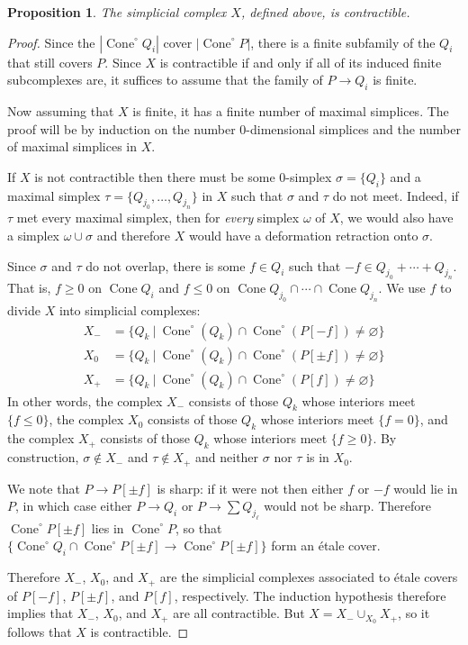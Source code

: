 \documentclass[12pt]{amsart}
\newtheorem{proposition}[theorem]{Proposition}
\theoremstyle{definition}
\theoremstyle{remark}
\def\Cone{\operatorname{Cone}}
\begin{document}
\begin{proposition}
The simplicial complex $X$, defined above, is contractible.
\end{proposition}
\begin{proof}
Since the $|\Cone^\circ Q_i|$ cover $|\Cone^\circ P|$, there is a finite subfamily of the $Q_i$ that still covers $P$.  Since $X$ is contractible if and only if all of its induced finite subcomplexes are, it suffices to assume that the family of $P \to Q_i$ is finite.

Now assuming that $X$ is finite, it has a finite number of maximal simplices.  The proof will be by induction on the number $0$-dimensional simplices and the number of maximal simplices in $X$.

If $X$ is not contractible then there must be some $0$-simplex $\sigma = \{ Q_i \}$ and a maximal simplex $\tau = \{ Q_{j_0}, \ldots, Q_{j_n} \}$ in $X$ such that $\sigma$ and $\tau$ do not meet.  Indeed, if $\tau$ met every maximal simplex, then for \emph{every} simplex $\omega$ of $X$, we would also have a simplex $\omega \cup \sigma$ and therefore $X$ would have a deformation retraction onto $\sigma$.

Since $\sigma$ and $\tau$ do not overlap, there is some $f \in Q_i$ such that $-f \in Q_{j_0} + \cdots + Q_{j_n}$.  That is, $f \geq 0$ on $\Cone Q_i$ and $f \leq 0$ on $\Cone Q_{j_0} \cap \cdots \cap \Cone Q_{j_n}$.  We use $f$ to divide $X$ into simplicial complexes:
\begin{align*}
X_- & = \{ Q_k \: \big| \: \Cone^\circ(Q_k) \cap \Cone^\circ(P[-f]) \neq \varnothing \} \\
X_0 & = \{ Q_k \: \big| \: \Cone^\circ(Q_k) \cap \Cone^\circ(P[\pm f]) \neq \varnothing \} \\
X_+ & = \{ Q_k \: \big| \: \Cone^\circ(Q_k) \cap \Cone^\circ(P[f]) \neq \varnothing \}
\end{align*}
In other words, the complex $X_-$ consists of those $Q_k$ whose interiors meet $\{ f \leq 0 \}$, the complex $X_0$ consists of those $Q_k$ whose interiors meet $\{ f = 0 \}$, and the complex $X_+$ consists of those $Q_k$ whose interiors meet $\{ f \geq 0 \}$.  By construction, $\sigma \not\in X_-$ and $\tau \not\in X_+$ and neither $\sigma$ nor $\tau$ is in $X_0$.  

We note that $P \to P[\pm f]$ is sharp:  if it were not then either $f$ or $-f$ would lie in $P$, in which case either $P \to Q_i$ or $P \to \sum Q_{j_\ell}$ would not be sharp.  Therefore $\Cone^\circ P[\pm f]$ lies in $\Cone^\circ P$, so that $\{ \Cone^\circ Q_i \cap \Cone^\circ P[\pm f] \to \Cone^\circ P[\pm f] \}$ form an \'etale cover.

Therefore $X_-$, $X_0$, and $X_+$ are the simplicial complexes associated to \'etale covers of $P[-f]$, $P[\pm f]$, and $P[f]$, respectively. The induction hypothesis therefore implies that $X_-$, $X_0$, and $X_+$ are all contractible.  But $X = X_- \cup_{X_0} X_+$, so it follows that $X$ is contractible.
\end{proof}
\end{document}
